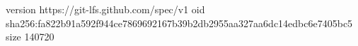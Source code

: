 version https://git-lfs.github.com/spec/v1
oid sha256:fa822b91a592f944ce7869692167b39b2db2955aa327aa6dc14edbc6e7405bc5
size 140720
